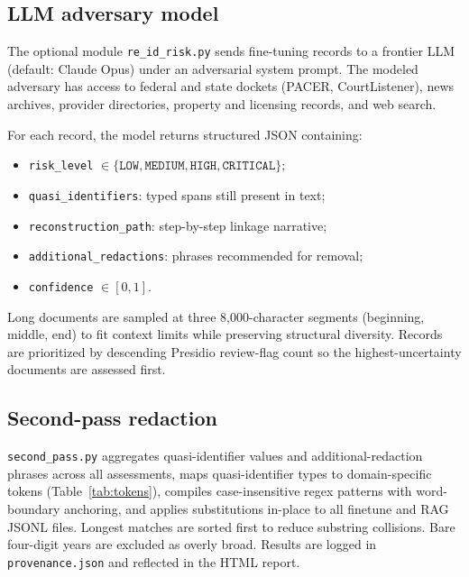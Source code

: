 \documentclass[11pt,a4paper]{article}
\begin{document}
\subsection{LLM adversary model}

The optional module \texttt{re\_id\_risk.py} sends fine-tuning records to a frontier LLM (default: Claude Opus) under an adversarial system prompt. The modeled adversary has access to federal and state dockets (PACER, CourtListener), news archives, provider directories, property and licensing records, and web search.

For each record, the model returns structured JSON containing:
\begin{itemize}[noitemsep]
  \item \texttt{risk\_level} $\in \{\texttt{LOW}, \texttt{MEDIUM}, \texttt{HIGH}, \texttt{CRITICAL}\}$;
  \item \texttt{quasi\_identifiers}: typed spans still present in text;
  \item \texttt{reconstruction\_path}: step-by-step linkage narrative;
  \item \texttt{additional\_redactions}: phrases recommended for removal;
  \item \texttt{confidence} $\in [0,1]$.
\end{itemize}

Long documents are sampled at three 8{,}000-character segments (beginning, middle, end) to fit context limits while preserving structural diversity. Records are prioritized by descending Presidio review-flag count so the highest-uncertainty documents are assessed first.

\subsection{Second-pass redaction}

\texttt{second\_pass.py} aggregates quasi-identifier values and additional-redaction phrases across all assessments, maps quasi-identifier types to domain-specific tokens (Table~\ref{tab:tokens}), compiles case-insensitive regex patterns with word-boundary anchoring, and applies substitutions in-place to all finetune and RAG JSONL files. Longest matches are sorted first to reduce substring collisions. Bare four-digit years are excluded as overly broad. Results are logged in \texttt{provenance.json} and reflected in the HTML report.
\end{document}
